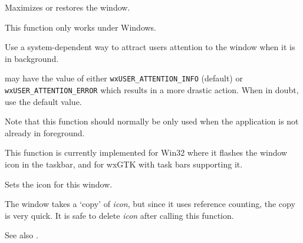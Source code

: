 
Maximizes or restores the window.




This function only works under Windows.




\label{wxtoplevelwindowrequestuserattention}


Use a system-dependent way to attract users attention to the window when it is
in background.

 may have the value of either \texttt{wxUSER\_ATTENTION\_INFO}
(default) or \texttt{wxUSER\_ATTENTION\_ERROR} which results in a more drastic
action. When in doubt, use the default value.

Note that this function should normally be only used when the application is
not already in foreground.

This function is currently implemented for Win32 where it flashes the
window icon in the taskbar, and for wxGTK with task bars supporting it.


\label{wxtoplevelwindowseticon}


Sets the icon for this window.




The window takes a `copy' of {\it icon}, but since it uses reference
counting, the copy is very quick. It is safe to delete {\it icon} after
calling this function.

See also .


\label{wxtoplevelwindowseticons}


